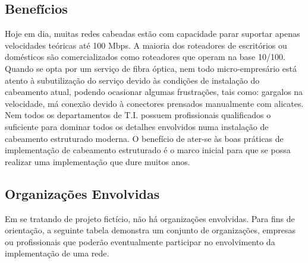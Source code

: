 \documentclass[	DIV=calc,%
							paper=a4,%
							fontsize=12pt,%
							onecolumn]{scrartcl}	 					%
\begin{document}
\subsection{Benefícios}
Hoje em dia, muitas redes cabeadas estão com capacidade parar suportar apenas velocidades teóricas até 100 Mbps. A maioria dos roteadores de escritórios ou domésticos são comercializados como roteadores que operam na base 10/100. Quando se opta por um serviço de fibra óptica, nem todo micro-empresário está atento à subutilização do serviço devido às condições de instalação do cabeamento atual, podendo ocasionar algumas frustrações, tais como: gargalos na velocidade, má conexão devido à conectores prensados manualmente com alicates. Nem todos os departamentos de T.I. possuem profissionais qualificados o suficiente para dominar todos os detalhes envolvidos numa instalação de cabeamento estruturado moderna. O benefício de ater-se às boas práticas de implementação de cabeamento estruturado é o marco inicial para que se possa realizar uma implementação que dure muitos anos.

\subsection{Organizações Envolvidas}
Em se tratando de projeto fictício, não há organizações envolvidas. Para fins de orientação, a seguinte tabela demonstra um conjunto de organizações, empresas ou profissionais que poderão eventualmente participar no envolvimento da implementação de uma rede.\\

\end{document}
